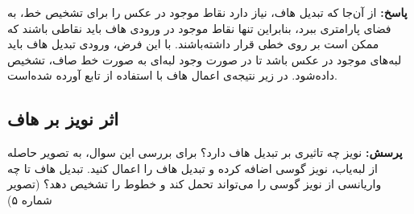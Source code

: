 \documentclass[12pt,a4paper]{article}
\theoremstyle{definition}
\theoremstyle{theorem}
\theoremstyle{definition}
\begin{document}
\textbf{پاسخ: }
از آن‌جا که تبدیل هاف، نیاز دارد نقاط موجود در عکس را برای تشخیص خط، به فضای پارامتری ببرد، بنابراین تنها نقاط موجود در ورودی هاف باید نقاطی باشند که ممکن است بر روی خطی قرار داشته‌باشند. با این فرض، ورودی تبدیل هاف باید لبه‌های موجود در عکس باشد تا در صورت وجود لبه‌ای به صورت خط صاف، تشخیص داده‌شود. 
در زیر نتیجه‌ی اعمال هاف با استفاده از تابع 
آورده شده‌است.

\vspace{0.2cm}
\begin{center}
\end{center}

\vspace{0.5cm}
\subsection{اثر نویز بر هاف}

\textbf{پرسش: }
نویز چه تاثیری بر تبدیل هاف دارد؟ برای بررسی این سوال، به تصویر حاصله از لبه‌یاب، نویز گوسی اضافه کرده و تبدیل هاف را اعمال کنید. تبدیل هاف تا چه واریانسی از نویز گوسی را می‌تواند تحمل کند و خطوط را تشخیص دهد؟ (تصویر شماره ۵)
\end{document}
